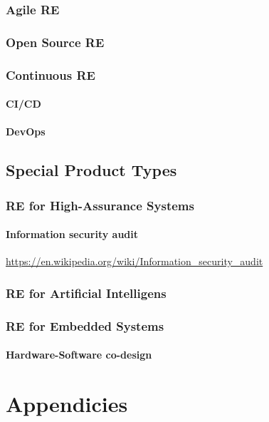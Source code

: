 \documentclass{reqengbook}
\begin{document}
\section{Agile RE}

\section{Open Source RE}

\section{Continuous RE}

\subsection{CI/CD}
\subsection{DevOps}

\chapter{Special Product Types}

\section{RE for High-Assurance Systems}
\subsection{Information security audit}
\url{https://en.wikipedia.org/wiki/Information_security_audit}

\section{RE for Artificial Intelligens}

\section{RE for Embedded Systems}
\subsection{Hardware-Software co-design}

\part{Appendicies}\appendix
\end{document}
